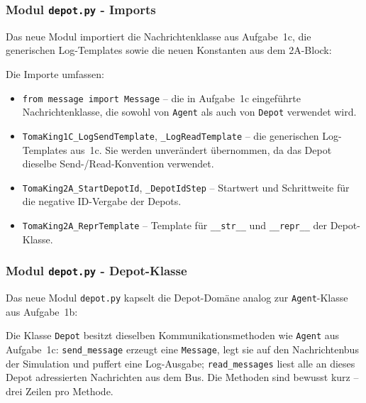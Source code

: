 
\subsubsection{Modul \texttt{depot.py} - Imports}

Das neue Modul importiert die Nachrichtenklasse aus Aufgabe~1c, die generischen Log-Templates sowie die neuen Konstanten aus dem 2A-Block:



Die Importe umfassen:
\begin{itemize}
    \item \texttt{from message import Message} -- die in Aufgabe~1c eingeführte Nachrichtenklasse, die sowohl von \texttt{Agent} als auch von \texttt{Depot} verwendet wird.
    \item \texttt{TomaKing1C\_LogSendTemplate}, \texttt{\_LogReadTemplate} -- die generischen Log-Templates aus~1c. Sie werden unverändert übernommen, da das Depot dieselbe Send-/Read-Konvention verwendet.
    \item \texttt{TomaKing2A\_StartDepotId}, \texttt{\_DepotIdStep} -- Startwert und Schrittweite für die negative ID-Vergabe der Depots.
    \item \texttt{TomaKing2A\_ReprTemplate} -- Template für \texttt{\_\_str\_\_} und \texttt{\_\_repr\_\_} der Depot-Klasse.
\end{itemize}


\subsubsection{Modul \texttt{depot.py} - Depot-Klasse}

Das neue Modul \texttt{depot.py} kapselt die Depot-Domäne analog zur \texttt{Agent}-Klasse aus Aufgabe~1b:



Die Klasse \texttt{Depot} besitzt dieselben Kommunikationsmethoden wie \texttt{Agent} aus Aufgabe~1c: \texttt{send\_message} erzeugt eine \texttt{Message}, legt sie auf den Nachrichtenbus der Simulation und puffert eine Log-Ausgabe; \texttt{read\_messages} liest alle an dieses Depot adressierten Nachrichten aus dem Bus. Die Methoden sind bewusst kurz -- drei Zeilen pro Methode.

